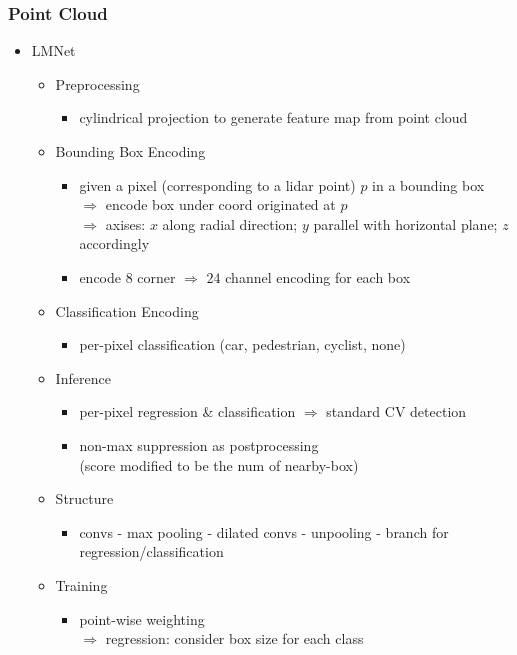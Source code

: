 \subsubsection{Point Cloud}
\begin{itemize}
\item LMNet
	\begin{itemize}
	\item Preprocessing
		\begin{itemize}
		\item cylindrical projection to generate feature map from point cloud
		\end{itemize}
	\item Bounding Box Encoding
		\begin{itemize}
		\item given a pixel (corresponding to a lidar point) $p$ in a bounding box \\ 
		$\Rightarrow$ encode box under coord originated at $p$ \\
		$\Rightarrow$ axises: $x$ along radial direction; $y$ parallel with horizontal plane; $z$ accordingly
		\item encode $8$ corner $\Rightarrow$ $24$ channel encoding for each box
		\end{itemize}
	\item Classification Encoding
		\begin{itemize}
		\item per-pixel classification (car, pedestrian, cyclist, none)
		\end{itemize}
	\item Inference
		\begin{itemize}
		\item per-pixel regression \& classification $\Rightarrow$ standard CV detection
		\item non-max suppression as postprocessing \\
		(score modified to be the num of nearby-box)
		\end{itemize}
	\item Structure
		\begin{itemize}
		\item convs - max pooling - dilated convs - unpooling - branch for regression/classification
		\end{itemize}
	\item Training
		\begin{itemize}
		\item point-wise weighting \\
		$\Rightarrow$ regression: consider box size for each class \\

\end{itemize}
\end{itemize}
\end{itemize}
